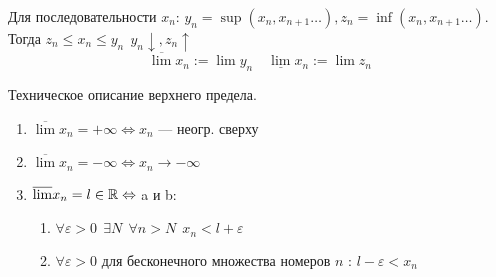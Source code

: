 

\cfoot{}



Для последовательности $x_n$:
$y_n=\sup(x_n, x_{n+1}\ldots), z_n=\inf(x_n, x_{n+1}\ldots)$. Тогда $z_n\leq x_n\leq y_n \ \ y_n\downarrow, z_n\uparrow$
$$\overline{\lim} x_n:=\lim y_n \quad \underline{\lim}x_n:=\lim z_n$$

\begin{theorem}
    Техническое описание верхнего предела.

    \begin{enumerate}
        \item $\overline \lim x_n = +\infty \Leftrightarrow x_n$ --- неогр. сверху
        \item $\overline \lim x_n = -\infty \Leftrightarrow x_n \to -\infty$
        \item $\overline \lim x_n = l\in\mathbb{R} \Leftrightarrow $ a и b:
        \begin{enumerate}
            \item $\forall \varepsilon > 0 \ \ \exists N \ \ \forall n > N \ \ x_n < l + \varepsilon$
            \item $\forall \varepsilon > 0 $ для бесконечного множества номеров $n$ : $l-\varepsilon < x_n$
        \end{enumerate}
    \end{enumerate}
\end{theorem}
